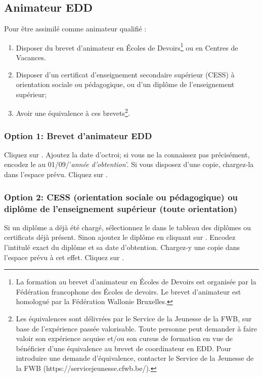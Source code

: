 \subsection{Animateur EDD} \label{ssec:animateur_edd}
Pour être assimilé comme animateur qualifié : 
\begin{enumerate}
    \item Disposer du brevet d’animateur en Écoles de Devoirs\footnote{La formation au brevet d'animateur en Écoles de Devoirs est organisée par la Fédération francophone des Écoles de devoirs. Le brevet d'animateur est homologué par la Fédération Wallonie Bruxelles.} ou en Centres de Vacances\up{\ref{note:bacv}}.
    \item Disposer d’un certificat d'enseignement secondaire supérieur (CESS) à orientation sociale ou pédagogique, ou d’un diplôme de l’enseignement supérieur;
    \item Avoir une équivalence à ces brevets\footnote{Les équivalences sont délivrées par le Service de la Jeunesse de la FWB, sur base de l’expérience passée valorisable. Toute personne peut demander à faire valoir son expérience acquise et/ou son cursus de formation en vue de bénéficier d’une équivalence au brevet de coordinateur en EDD.
    Pour introduire une demande d'équivalence, contacter le Service de la Jeunesse de la FWB (https://servicejeunesse.cfwb.be/).}.
\end{enumerate}




\subsubsection{Option 1: Brevet d'animateur EDD}
Cliquez sur . Ajoutez la date d'octroi; si vous ne la connaissez pas précisément, encodez le au 01/09/'\textit{année d'obtention}'. Si vous disposez d'une copie, chargez-la dans l'espace prévu. Cliquez sur .

\subsubsection{Option 2: CESS (orientation sociale ou pédagogique) ou diplôme de l'enseignement supérieur (toute orientation)}
Si un diplôme a déjà été chargé, sélectionnez le dans le tableau des diplômes ou certificats déjà présent.
Sinon ajoutez le diplôme en cliquant sur . Encodez l'intitulé exact du diplôme et sa date d'obtention. Chargez-y une copie dans l'espace prévu à cet effet. Cliquez sur .


